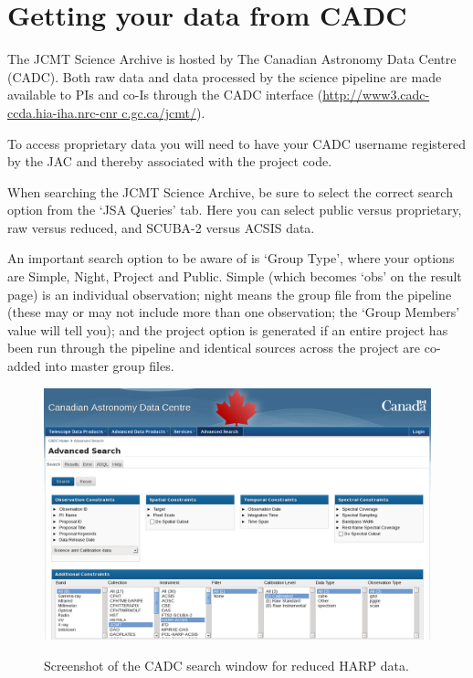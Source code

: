 \documentclass[11pt,oneside,chapters]{starlink}
\begin{document}
\section{Getting your data from CADC}

The JCMT Science Archive is hosted by The Canadian Astronomy Data
Centre (CADC). Both raw data and data processed by the science pipeline
are made available to PIs and co-Is through the CADC interface
(\url{http://www3.cadc-ccda.hia-iha.nrc-cnr c.gc.ca/jcmt/}).

To access proprietary data you will need to have your CADC username
registered by the JAC and thereby associated with the project code.

When searching the JCMT Science Archive, be sure to select the correct
search option from the `JSA Queries' tab. Here you can select public
versus proprietary, raw versus reduced, and SCUBA-2 versus ACSIS data.

An important search option to be aware of is `Group Type', where your
options are Simple, Night, Project and Public. Simple (which becomes
`obs' on the result page) is an individual observation; night means
the group file from the pipeline (these may or may not include more
than one observation; the `Group Members' value will tell you); and the
project option is generated if an entire project has been run through
the pipeline and identical sources across the project are co-added
into master group files.

\begin{figure}[b!]
\begin{center}
\includegraphics[width=0.98\linewidth]{sc20_cadc}
\label{fig:cadc}
\caption{Screenshot of the CADC search window for reduced HARP data.}
\end{center}
\end{figure}
\end{document}
